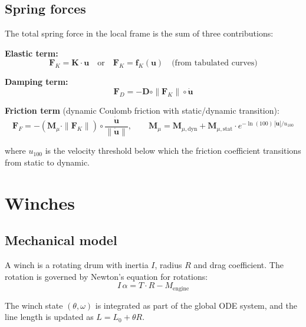 \documentclass[11pt]{article}
\begin{document}
\subsection{Spring forces}

The total spring force in the local frame is the sum of three contributions:

\textbf{Elastic term:}
\begin{equation}
\mathbf{F}_K = \mathbf{K}\cdot\mathbf{u} \quad\text{or}\quad \mathbf{F}_K = \mathbf{f}_K(\mathbf{u}) \quad\text{(from tabulated curves)}
\end{equation}

\textbf{Damping term:}
\begin{equation}
\mathbf{F}_D = -\mathbf{D}\circ\|\mathbf{F}_K\|\circ\dot{\mathbf{u}}
\end{equation}

\textbf{Friction term} (dynamic Coulomb friction with static/dynamic transition):
\begin{equation}
\mathbf{F}_F = -\left(\mathbf{M}_\mu\cdot\|\mathbf{F}_K\|\right)\circ\frac{\dot{\mathbf{u}}}{\|\dot{\mathbf{u}}\|}, \qquad \mathbf{M}_\mu = \mathbf{M}_{\mu,\text{dyn}} + \mathbf{M}_{\mu,\text{stat}}\cdot e^{-\ln(100)\,|\dot{\mathbf{u}}|/u_{100}}
\end{equation}

where $u_{100}$ is the velocity threshold below which the friction coefficient transitions from static to dynamic.


\section{Winches}
\label{sec:winches}

\subsection{Mechanical model}

A winch is a rotating drum with inertia $I$, radius $R$ and drag coefficient. The rotation is governed by Newton's equation for rotations:
\begin{equation}
I\,\alpha = T\cdot R - M_{\text{engine}}
\end{equation}

The winch state $(\theta, \omega)$ is integrated as part of the global ODE system, and the line length is updated as $L = L_0 + \theta R$.
\end{document}
